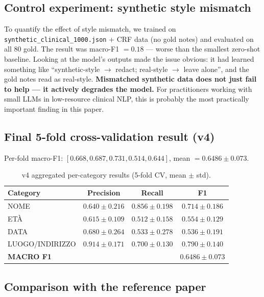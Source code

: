 \documentclass[11pt,a4paper]{article}
\begin{document}
\subsection{Control experiment: synthetic style mismatch}

To quantify the effect of style mismatch, we trained on \texttt{synthetic\_clinical\_1000.json} + CRF data (no gold notes) and evaluated on all 80 gold. The result was macro-F1 $= 0.18$ — worse than the smallest zero-shot baseline. Looking at the model's outputs made the issue obvious: it had learned something like ``synthetic-style $\to$ redact; real-style $\to$ leave alone'', and the gold notes read as real-style. \textbf{Mismatched synthetic data does not just fail to help — it actively degrades the model.} For practitioners working with small LLMs in low-resource clinical NLP, this is probably the most practically important finding in this paper.

\subsection{Final 5-fold cross-validation result (v4)}

Per-fold macro-F1: $[0.668, 0.687, 0.731, 0.514, 0.644]$, mean $= 0.6486 \pm 0.073$.

\begin{table}[h]
\centering
\caption{v4 aggregated per-category results (5-fold CV, mean $\pm$ std).}
\label{tab:v4-categories}
\begin{tabular}{lccc}
\toprule
Category & Precision & Recall & \textbf{F1} \\
\midrule
NOME              & $0.640 \pm 0.216$ & $0.856 \pm 0.198$ & $\mathbf{0.714 \pm 0.186}$ \\
ETÀ               & $0.615 \pm 0.109$ & $0.512 \pm 0.158$ & $\mathbf{0.554 \pm 0.129}$ \\
DATA              & $0.680 \pm 0.264$ & $0.533 \pm 0.278$ & $\mathbf{0.536 \pm 0.191}$ \\
LUOGO/INDIRIZZO   & $0.914 \pm 0.171$ & $0.700 \pm 0.130$ & $\mathbf{0.790 \pm 0.140}$ \\
\midrule
\textbf{MACRO F1} & & & $\mathbf{0.6486 \pm 0.073}$ \\
\bottomrule
\end{tabular}
\end{table}

\subsection{Comparison with the reference paper}
\end{document}
